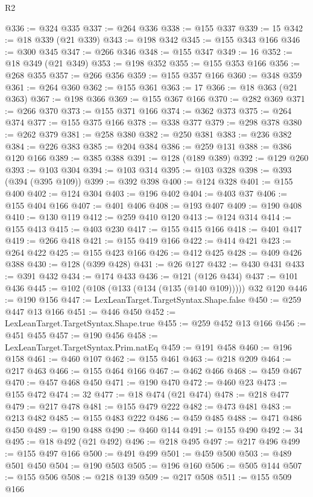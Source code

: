 \begin{lexlean}{R2}
\begin{coremodule}
@336 := @324 @335
@337 := @264 @336
@338 := @155 @337
@339 := 15
@342 := @18 @339 (@21 @339)
@343 := @198 @342
@345 := @155 @343 @166
@346 := @300 @345
@347 := @266 @346
@348 := @155 @347
@349 := 16
@352 := @18 @349 (@21 @349)
@353 := @198 @352
@355 := @155 @353 @166
@356 := @268 @355
@357 := @266 @356
@359 := @155 @357 @166
@360 := @348 @359
@361 := @264 @360
@362 := @155 @361
@363 := 17
@366 := @18 @363 (@21 @363)
@367 := @198 @366
@369 := @155 @367 @166
@370 := @282 @369
@371 := @266 @370
@373 := @155 @371 @166
@374 := @362 @373
@375 := @264 @374
@377 := @155 @375 @166
@378 := @338 @377
@379 := @298 @378
@380 := @262 @379
@381 := @258 @380
@382 := @250 @381
@383 := @236 @382
@384 := @226 @383
@385 := @204 @384
@386 := @259 @131
@388 := @386 @120 @166
@389 := @385 @388
@391 := @128 (@189 @389)
@392 := @129 @260
@393 := @103 @304
@394 := @103 @314
@395 := @103 @328
@398 := @393 (@394 (@395 @109))
@399 := @392 @398
@400 := @124 @328
@401 := @155 @400
@402 := @124 @304
@403 := @196 @402
@404 := @403 @37
@406 := @155 @404 @166
@407 := @401 @406
@408 := @193 @407
@409 := @190 @408
@410 := @130 @119
@412 := @259 @410 @120
@413 := @124 @314
@414 := @155 @413
@415 := @403 @230
@417 := @155 @415 @166
@418 := @401 @417
@419 := @266 @418
@421 := @155 @419 @166
@422 := @414 @421
@423 := @264 @422
@425 := @155 @423 @166
@426 := @412 @425
@428 := @409 @426 @388
@430 := @128 (@399 @428)
@431 := @26 @127
@432 := @430 @431
@433 := @391 @432
@434 := @174 @433
@436 := @121 (@126 @434)
@437 := @101 @436
@445 := @102 (@108 (@133 (@134 (@135 (@140 @109))))) @32 @120
@446 := @190 @156
@447 := LexLeanTarget.TargetSyntax.Shape.false
@450 := @259 @447 @13 @166
@451 := @446 @450
@452 := LexLeanTarget.TargetSyntax.Shape.true
@455 := @259 @452 @13 @166
@456 := @451 @455
@457 := @190 @456
@458 := LexLeanTarget.TargetSyntax.Prim.natEq
@459 := @191 @458
@460 := @196 @158
@461 := @460 @107
@462 := @155 @461
@463 := @218 @209
@464 := @217 @463
@466 := @155 @464 @166
@467 := @462 @466
@468 := @459 @467
@470 := @457 @468 @450
@471 := @190 @470
@472 := @460 @23
@473 := @155 @472
@474 := 32
@477 := @18 @474 (@21 @474)
@478 := @218 @477
@479 := @217 @478
@481 := @155 @479 @222
@482 := @473 @481
@483 := @213 @482
@485 := @155 @483 @222
@486 := @459 @485
@488 := @471 @486 @450
@489 := @190 @488
@490 := @460 @144
@491 := @155 @490
@492 := 34
@495 := @18 @492 (@21 @492)
@496 := @218 @495
@497 := @217 @496
@499 := @155 @497 @166
@500 := @491 @499
@501 := @459 @500
@503 := @489 @501 @450
@504 := @190 @503
@505 := @196 @160
@506 := @505 @144
@507 := @155 @506
@508 := @218 @139
@509 := @217 @508
@511 := @155 @509 @166

\end{coremodule}
\end{lexlean}
